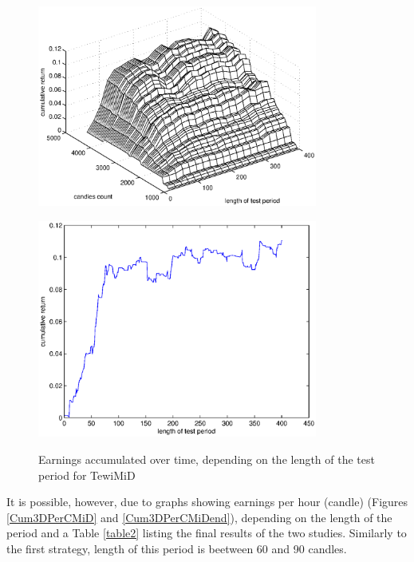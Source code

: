 \documentclass{tewiart}
\begin{document}
\begin{figure}[h!]
\centering
\begin{minipage}{.459\linewidth}
\begin{center}
\includegraphics[width=0.82\textwidth]{pictures/cumulativeReturnsD.eps}
\label{Cum3DMiD}
\end{center}
\end{minipage}
\begin{minipage}{.49\linewidth}
\begin{center}
\includegraphics[width=0.82\textwidth]{pictures/mid_end.eps}
\label{Cum3DMiDend}
\end{center}
\end{minipage}
\caption{Earnings accumulated over time, depending on the length of the test period for TewiMiD}
\end{figure}
\FloatBarrier

It is possible, however, due to graphs showing earnings per hour (candle) (Figures \ref{Cum3DPerCMiD} and \ref{Cum3DPerCMiDend}), depending on the length of the period and a Table \ref{table2} listing the final results of the two studies. Similarly to the first strategy, length of this period is beetween 60  and 90 candles.
\end{document}
